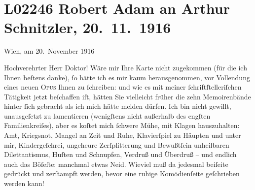 

\section[Robert Adam an Arthur Schnitzler, 20. 11. 1916]{L02246 Robert Adam an Arthur Schnitzler, 20. 11. 1916}
\nopagebreak{}
\rehead{ }\normalsize\beginnumbering{}
\toendnotes[C]{\smallbreak\pagebreak[2]}
\toendnotes[C]{\smallbreak}
\pstart
           \raggedleft{}{\pb}Wien, am 20. November 1916\pend
           
\pstart{}Hochverehrter Herr Doktor!\pend\vspace{0.5em}
\pstart
           Wäre mir Ihre Karte nicht zugekommen (für die ich Ihnen beſtens danke), ſo hätte ich
               es mir kaum herausgenommen, vor Vollendung eines neuen \textsc{Opus}
               Ihnen zu ſchreiben: und wie es mit meiner ſchriftſtelleriſchen Tätigkeit jetzt
               beſchaffen iſt,  hätten Sie vielleicht früher die
               zehn Memoirenbände hinter ſich
               gebracht als ich mich hätte melden dürfen. Ich bin nicht gewillt, unausgeſetzt zu
               lamentieren (wenigſtens nicht außerhalb des engſten Familienkreiſes), aber es koſtet
               mich ſchwere Mühe, mit Klagen hauszuhalten: Amt, Kriegs{\pb}not, Mangel an Zeit und Ruhe, Klavierſpiel zu Häupten und unter mir,
               Kindergeſchrei, ungeheure Zerſplitterung und Bewußtſein unheilbaren Dilettantismus,
               Huſten und Schnupfen, Verdruß und Überdruß – und endlich auch das Böſeſte: manchmal
               etwas Neid. Wieviel muß da jedesmal beiſeite gedrückt und zerſtampft werden, bevor
               eine ruhige Komödienſeite geſchrieben werden kann!\pend
           
